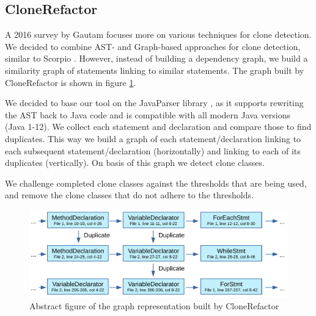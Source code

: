 \documentclass[a4paper]{article}
\begin{document}
\subsection{CloneRefactor}
A 2016 survey by Gautam \cite{gautam2016various} focuses more on various techniques for clone detection. We decided to combine AST- and Graph-based approaches for clone detection, similar to Scorpio \cite{higo2013revisiting, kamalpriya2017enhancing}. However, instead of building a dependency graph, we build a similarity graph of statements linking to similar statements. The graph built by CloneRefactor is shown in figure \ref{fig:clonerefactor}.

We decided to base our tool on the JavaParser library \cite{tomassetti2017javaparser}, as it supports rewriting the AST back to Java code and is compatible with all modern Java versions (Java 1-12). We collect each statement and declaration and compare those to find duplicates. This way we build a graph of each statement/declaration linking to each subsequent statement/declaration (horizontally) and linking to each of its duplicates (vertically). On basis of this graph we detect clone classes.

We challenge completed clone classes against the thresholds that are being used, and remove the clone classes that do not adhere to the thresholds.

\begin{figure}[H]
  \includegraphics[width=1\columnwidth]{img/CodeGraph}
  \caption{Abstract figure of the graph representation built by CloneRefactor}
  \label{fig:clonerefactor}
\end{figure}
\end{document}
